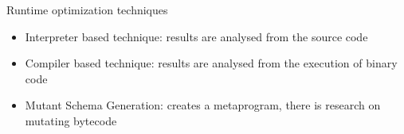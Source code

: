 Runtime optimization techniques
\begin{itemize}
	\item Interpreter based technique: results are analysed from the source code
	\item Compiler based technique: results are analysed from the execution of binary code 
	\item Mutant Schema Generation: creates a metaprogram, there is research on mutating bytecode
\end{itemize}


